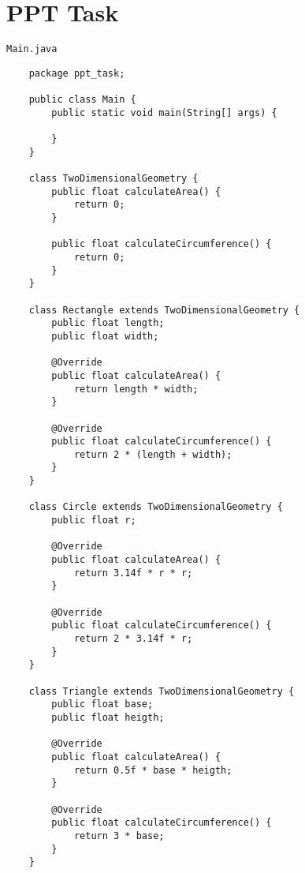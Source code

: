 \documentclass[12pt,titlepage]{article}
\begin{document}
\section{PPT Task}
\texttt{Main.java}
\begin{verbatim}
    package ppt_task;

    public class Main {
        public static void main(String[] args) {
            
        }
    }

    class TwoDimensionalGeometry {
        public float calculateArea() {
            return 0;
        }

        public float calculateCircumference() {
            return 0;
        }
    }

    class Rectangle extends TwoDimensionalGeometry {
        public float length;
        public float width;

        @Override
        public float calculateArea() {
            return length * width;
        }

        @Override
        public float calculateCircumference() {
            return 2 * (length + width);
        }
    }

    class Circle extends TwoDimensionalGeometry {
        public float r;

        @Override
        public float calculateArea() {
            return 3.14f * r * r;
        }

        @Override
        public float calculateCircumference() {
            return 2 * 3.14f * r;
        }
    }

    class Triangle extends TwoDimensionalGeometry {
        public float base;
        public float heigth;

        @Override
        public float calculateArea() {
            return 0.5f * base * heigth;
        }

        @Override
        public float calculateCircumference() {
            return 3 * base;
        }
    }
\end{verbatim}
\end{document}
